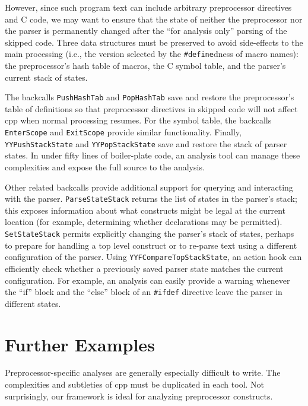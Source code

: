 \documentclass{article}
\newcommand{\Cpp}{\mbox{\textsf{cpp}}}
\newcommand{\C}{\mbox{C}}
\newcommand{\ppd}[1]{\texttt{\##1}}
\newcommand{\ie}{i.e.,}
\begin{document}
However, since such program text can include arbitrary preprocessor
directives and \C{} code, we may want to ensure that the state of
neither the preprocessor nor the parser is permanently changed after the
``for analysis only'' parsing of the skipped code.  Three data
structures must be preserved to avoid side-effects to the main
processing (\ie{} the version selected by the \ppd{define}dness of macro
names): the preprocessor's hash table of macros, the \C{} symbol table,
and the parser's current stack of states.  

The backcalls \texttt{PushHashTab} and \texttt{PopHashTab} save and
restore the preprocessor's table of definitions so that preprocessor
directives in skipped code will not affect \Cpp{} when normal processing
resumes.  For the symbol table, the backcalls \texttt{EnterScope} and
\texttt{ExitScope} provide similar functionality.  Finally,
\texttt{YYPushStackState} and \texttt{YYPopStackState} save and restore
the stack of parser states.  In under fifty lines of boiler-plate code,
an analysis tool can manage these complexities and expose the full source to
the analysis.

Other related backcalls provide additional support for querying and
interacting with the parser.  \texttt{ParseStateStack} returns the
list of states in the parser's stack; this exposes information about what
constructs might be legal at the current location (for example,
determining whether declarations may be permitted).
\texttt{SetStateStack} permits explicitly changing the parser's stack
of states, perhaps to prepare for handling a top level construct or to
re-parse text using a different configuration of the parser.  Using
\texttt{YYFCompareTopStackState}, an action hook can efficiently check
whether a previously saved parser state matches the current
configuration.  For example, an analysis can easily provide a warning
whenever the ``if'' block and the ``else'' block of an \ppd{ifdef}
directive leave the parser in different states.


\section{Further Examples}
\label{sec:further_examples}

Preprocessor-specific analyses are generally especially difficult to
write.  The complexities and subtleties of \Cpp{} must be duplicated in
each tool.  Not surprisingly, our framework is ideal for analyzing
preprocessor constructs.
\end{document}
